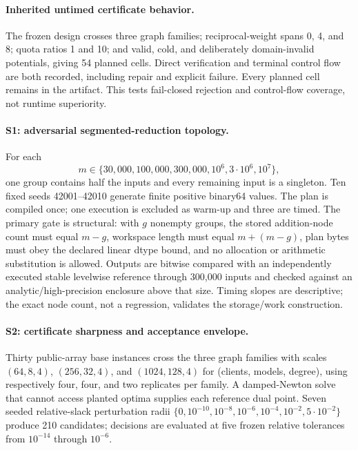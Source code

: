 \paragraph{Inherited untimed certificate behavior.}
The frozen design crosses three graph families; reciprocal-weight spans 0, 4,
and 8; quota ratios 1 and 10; and valid, cold, and deliberately domain-invalid
potentials, giving 54 planned cells.  Direct verification and terminal control
flow are both recorded, including repair and explicit failure.  Every planned
cell remains in the artifact.  This tests fail-closed rejection and control-flow
coverage, not runtime superiority.

\paragraph{S1: adversarial segmented-reduction topology.}
For each
\[
m\in\{30{,}000,100{,}000,300{,}000,10^6,3\cdot10^6,10^7\},
\]
one
group contains half the inputs and every remaining input is a singleton.  Ten
fixed seeds 42001--42010 generate finite positive binary64 values.  The plan is
compiled once; one execution is excluded as warm-up and three are timed.  The
primary gate is structural: with $g$ nonempty groups, the stored addition-node
count must equal $m-g$, workspace length must equal $m+(m-g)$, plan bytes must
obey the declared linear dtype bound, and no allocation or arithmetic
substitution is allowed.  Outputs are bitwise compared with an independently
executed stable levelwise reference through 300,000 inputs and checked against
an analytic/high-precision enclosure above that size.  Timing slopes are
descriptive; the exact node count, not a regression, validates the storage/work
construction.

\paragraph{S2: certificate sharpness and acceptance envelope.}
Thirty public-array base instances cross the three graph families with scales
$(64,8,4)$, $(256,32,4)$, and $(1024,128,4)$ for (clients, models, degree),
using respectively four, four, and two replicates per family.  A damped-Newton
solve that cannot access planted optima supplies each reference dual point.
Seven seeded relative-slack perturbation radii
$\{0,10^{-10},10^{-8},10^{-6},10^{-4},10^{-2},5\cdot10^{-2}\}$ produce 210
candidates; decisions are evaluated at five frozen relative tolerances from
$10^{-14}$ through $10^{-6}$.

